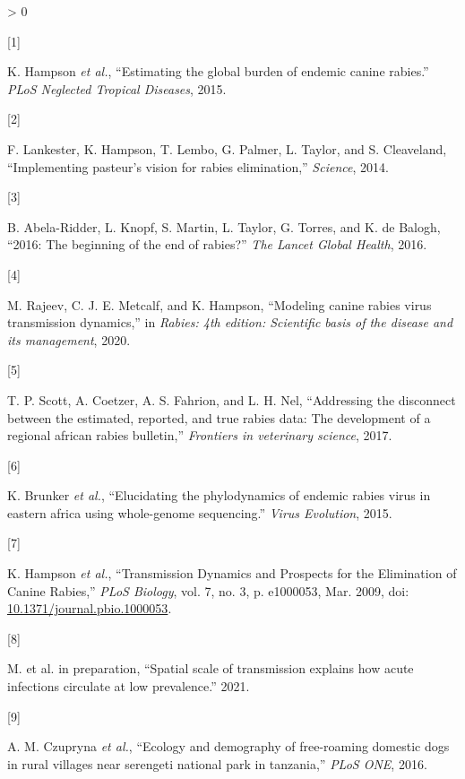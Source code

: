 \documentclass[
]{book}
\newlength{\cslhangindent}
\newlength{\csllabelwidth}
\newenvironment{CSLReferences}[2] %
 {%
  \setlength{\parindent}{0pt}
  \ifodd #1 \everypar{\setlength{\hangindent}{\cslhangindent}}\ignorespaces\fi
  \ifnum #2 > 0
  \setlength{\parskip}{#2\baselineskip}
  \fi
 }%
 {}
\newcommand{\CSLLeftMargin}[1]{\parbox[t]{\csllabelwidth}{#1}}
\newcommand{\CSLRightInline}[1]{\parbox[t]{\linewidth - \csllabelwidth}{#1}\break}
\begin{document}
\hypertarget{refs_main}{}
\begin{CSLReferences}{0}{0}
\leavevmode\hypertarget{ref-hampson2015}{}%
\CSLLeftMargin{{[}1{]} }
\CSLRightInline{K. Hampson \emph{et al.}, {``Estimating the global burden of endemic canine rabies.''} \emph{PLoS Neglected Tropical Diseases}, 2015.}

\leavevmode\hypertarget{ref-lankester2014}{}%
\CSLLeftMargin{{[}2{]} }
\CSLRightInline{F. Lankester, K. Hampson, T. Lembo, G. Palmer, L. Taylor, and S. Cleaveland, {``Implementing pasteur's vision for rabies elimination,''} \emph{Science}, 2014.}

\leavevmode\hypertarget{ref-abela-ridder2016}{}%
\CSLLeftMargin{{[}3{]} }
\CSLRightInline{B. Abela-Ridder, L. Knopf, S. Martin, L. Taylor, G. Torres, and K. de Balogh, {``2016: The beginning of the end of rabies?''} \emph{The Lancet Global Health}, 2016.}

\leavevmode\hypertarget{ref-rajeev2020modeling}{}%
\CSLLeftMargin{{[}4{]} }
\CSLRightInline{M. Rajeev, C. J. E. Metcalf, and K. Hampson, {``Modeling canine rabies virus transmission dynamics,''} in \emph{Rabies: 4th edition: Scientific basis of the disease and its management}, 2020.}

\leavevmode\hypertarget{ref-scott2017}{}%
\CSLLeftMargin{{[}5{]} }
\CSLRightInline{T. P. Scott, A. Coetzer, A. S. Fahrion, and L. H. Nel, {``Addressing the disconnect between the estimated, reported, and true rabies data: The development of a regional african rabies bulletin,''} \emph{Frontiers in veterinary science}, 2017.}

\leavevmode\hypertarget{ref-brunker2015}{}%
\CSLLeftMargin{{[}6{]} }
\CSLRightInline{K. Brunker \emph{et al.}, {``Elucidating the phylodynamics of endemic rabies virus in eastern africa using whole-genome sequencing.''} \emph{Virus Evolution}, 2015.}

\leavevmode\hypertarget{ref-Hampson2009}{}%
\CSLLeftMargin{{[}7{]} }
\CSLRightInline{K. Hampson \emph{et al.}, {``Transmission Dynamics and Prospects for the Elimination of Canine Rabies,''} \emph{PLoS Biology}, vol. 7, no. 3, p. e1000053, Mar. 2009, doi: \href{https://doi.org/10.1371/journal.pbio.1000053}{10.1371/journal.pbio.1000053}.}

\leavevmode\hypertarget{ref-Mancyinprep}{}%
\CSLLeftMargin{{[}8{]} }
\CSLRightInline{M. et al. in preparation, {``Spatial scale of transmission explains how acute infections circulate at low prevalence.''} 2021.}

\leavevmode\hypertarget{ref-czupryna2016}{}%
\CSLLeftMargin{{[}9{]} }
\CSLRightInline{A. M. Czupryna \emph{et al.}, {``Ecology and demography of free-roaming domestic dogs in rural villages near serengeti national park in tanzania,''} \emph{PLoS ONE}, 2016.}


\end{CSLReferences}
\end{document}
